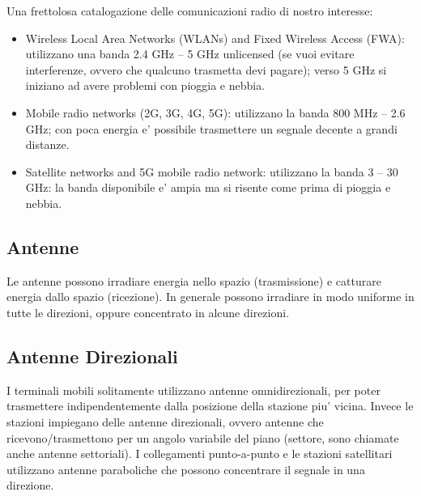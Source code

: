 
Una frettolosa catalogazione delle comunicazioni radio di nostro interesse:

\begin{itemize}
  \item Wireless Local Area Networks (WLANs) and Fixed Wireless Access (FWA): utilizzano una banda 2.4 GHz – 5 GHz unlicensed (se vuoi evitare interferenze, ovvero che qualcuno trasmetta devi pagare); verso 5 GHz si iniziano ad avere problemi con pioggia e nebbia.
  \item Mobile radio networks (2G, 3G, 4G, 5G): utilizzano la banda 800 MHz – 2.6 GHz; con poca energia e' possibile trasmettere un segnale decente a grandi distanze.
  \item Satellite networks and 5G mobile radio network: utilizzano la banda 3 – 30 GHz: la banda disponibile e' ampia ma si risente come prima di pioggia e nebbia.
\end{itemize}

\subsection{Antenne}

Le antenne possono irradiare energia nello spazio (trasmissione) e catturare energia dallo spazio (ricezione).
In generale possono irradiare in modo uniforme in tutte le direzioni, oppure concentrato in alcune direzioni.


\subsection{Antenne Direzionali}

I terminali mobili solitamente utilizzano antenne omnidirezionali, per poter trasmettere indipendentemente dalla posizione della stazione piu' vicina.
Invece le stazioni impiegano delle antenne direzionali, ovvero antenne che ricevono/trasmettono per un angolo variabile del piano (settore, sono chiamate anche antenne settoriali).
I collegamenti punto-a-punto e le stazioni satellitari utilizzano antenne paraboliche che possono concentrare il segnale in una direzione.



